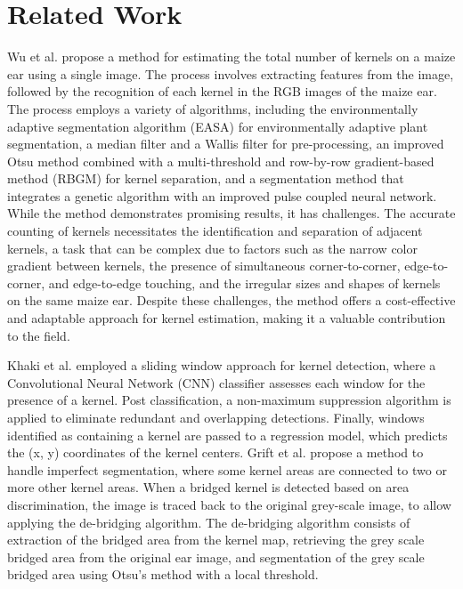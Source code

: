 \section{Related Work}
Wu et al.\cite{wu2020kernelcounting} propose a method for estimating the total number of kernels on a maize ear using a single image. The process involves extracting features from the image, followed by the recognition of each kernel in the RGB images of the maize ear. The process employs a variety of algorithms, including the environmentally adaptive segmentation algorithm (EASA) for environmentally adaptive plant segmentation, a median filter and a Wallis filter for pre-processing, an improved Otsu method combined with a multi-threshold and row-by-row gradient-based method (RBGM) for kernel separation, and a segmentation method that integrates a genetic algorithm with an improved pulse coupled neural network. While the method demonstrates promising results, it has challenges. The accurate counting of kernels necessitates the identification and separation of adjacent kernels, a task that can be complex due to factors such as the narrow color gradient between kernels, the presence of simultaneous corner-to-corner, edge-to-corner, and edge-to-edge touching, and the irregular sizes and shapes of kernels on the same maize ear. Despite these challenges, the method offers a cost-effective and adaptable approach for kernel estimation, making it a valuable contribution to the field.

Khaki et al.\cite{khaki2020corndetection} employed a sliding window approach for kernel detection, where a Convolutional Neural Network (CNN) classifier assesses each window for the presence of a kernel. Post classification, a non-maximum suppression algorithm is applied to eliminate redundant and overlapping detections. Finally,  windows identified as containing a kernel are passed to a regression model, which predicts the (x, y) coordinates of the kernel centers. Grift et al. \cite{grift2017kernelcounting} propose a method to handle imperfect segmentation, where some kernel areas are connected to two or more other kernel areas. When a bridged kernel is detected based on area discrimination, the image is traced back to the original grey-scale image, to allow applying the de-bridging algorithm. The de-bridging algorithm consists of extraction of the bridged area from the kernel map, retrieving the grey scale bridged area from the original ear image, and segmentation of the grey scale bridged area using Otsu's method with a local threshold.
  
